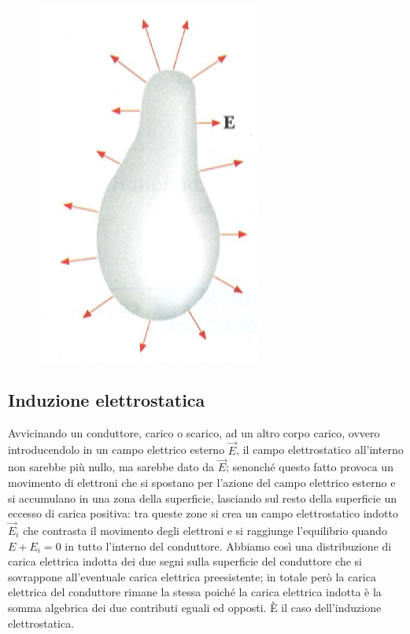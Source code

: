 \documentclass[class=book, crop=false, oneside, 12pt]{standalone}
\begin{document}
\begin{figure}[h]
    \includegraphics[scale=0.4]{conduttore_linee.png}
    \centering
    \caption{}
\end{figure}

\subsection{Induzione elettrostatica}

Avvicinando un conduttore, carico o scarico, ad un altro corpo carico, ovvero introducendolo in un campo elettrico esterno \(\overrightarrow{E}\), il campo elettrostatico all'interno non sarebbe più nullo, ma sarebbe dato da \(\overrightarrow{E}\); senonché questo fatto provoca un movimento di elettroni che si spostano per l'azione del campo elettrico esterno e si accumulano in una zona della superficie, lasciando sul resto della superficie un eccesso di carica positiva: 
tra queste zone si crea un campo elettrostatico indotto \(\overrightarrow{E}_i\) che contrasta il movimento degli elettroni e si raggiunge l'equilibrio quando \(E + E_i = 0\) in tutto l'interno del conduttore.
Abbiamo così una distribuzione di carica elettrica indotta dei due segni sulla superficie del conduttore che si sovrappone all'eventuale carica elettrica preesistente; in totale però la carica elettrica del conduttore rimane la stessa poiché la carica elettrica indotta è la somma algebrica dei due contributi eguali ed opposti.
È il caso dell'induzione elettrostatica.
\end{document}
